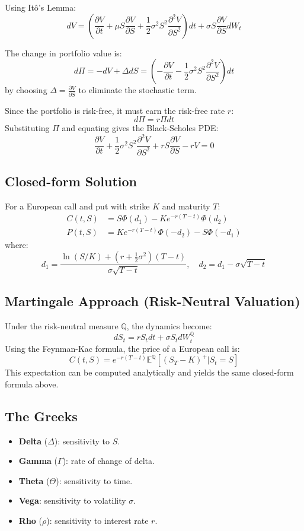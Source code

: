 Using It\^o's Lemma:
\[
 dV = \left(\frac{\partial V}{\partial t} + \mu S \frac{\partial V}{\partial S} + \frac{1}{2} \sigma^2 S^2 \frac{\partial^2 V}{\partial S^2}\right) dt + \sigma S \frac{\partial V}{\partial S} dW_t
\]

The change in portfolio value is:
\[
 d\Pi = -dV + \Delta dS = \left( -\frac{\partial V}{\partial t} - \frac{1}{2} \sigma^2 S^2 \frac{\partial^2 V}{\partial S^2} \right) dt
\]
by choosing $\Delta = \frac{\partial V}{\partial S}$ to eliminate the stochastic term.

Since the portfolio is risk-free, it must earn the risk-free rate $r$:
\[
 d\Pi = r\Pi dt
\]
Substituting $\Pi$ and equating gives the Black-Scholes PDE:
\[
\frac{\partial V}{\partial t} + \frac{1}{2}\sigma^2 S^2 \frac{\partial^2 V}{\partial S^2} + r S \frac{\partial V}{\partial S} - r V = 0
\]

\subsection*{Closed-form Solution}
For a European call and put with strike $K$ and maturity $T$:
\begin{align*}
C(t, S) &= S \Phi(d_1) - K e^{-r(T-t)} \Phi(d_2) \\
P(t, S) &= K e^{-r(T-t)} \Phi(-d_2) - S \Phi(-d_1)
\end{align*}
where:
\[
d_1 = \frac{\ln(S/K) + (r + \frac{1}{2}\sigma^2)(T - t)}{\sigma\sqrt{T - t}}, \quad
d_2 = d_1 - \sigma\sqrt{T - t}
\]

\subsection*{Martingale Approach (Risk-Neutral Valuation)}
Under the risk-neutral measure $\mathbb{Q}$, the dynamics become:
\[
dS_t = r S_t dt + \sigma S_t dW_t^{\mathbb{Q}}
\]
Using the Feynman-Kac formula, the price of a European call is:
\[
C(t, S) = e^{-r(T-t)} \mathbb{E}^{\mathbb{Q}}[(S_T - K)^+ | S_t = S]
\]
This expectation can be computed analytically and yields the same closed-form formula above.

\subsection*{The Greeks}
\begin{itemize}
  \item \textbf{Delta} ($\Delta$): sensitivity to $S$.
  \item \textbf{Gamma} ($\Gamma$): rate of change of delta.
  \item \textbf{Theta} ($\Theta$): sensitivity to time.
  \item \textbf{Vega}: sensitivity to volatility $\sigma$.
  \item \textbf{Rho} ($\rho$): sensitivity to interest rate $r$.
\end{itemize}

